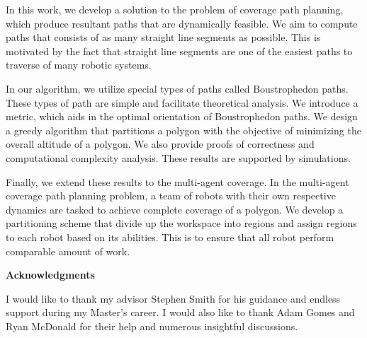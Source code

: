 In this work, we develop a solution to the problem of coverage path planning, which produce resultant paths that are dynamically feasible. We aim to compute paths that consists of as many straight line segments as possible. This is motivated by the fact that straight line segments are one of the easiest paths to traverse of many robotic systems. 

In our algorithm, we utilize special types of paths called Boustrophedon paths. These types of path are simple and facilitate theoretical analysis. We introduce a metric, which aids in the optimal orientation of Boustrophedon paths. We design a greedy algorithm that partitions a polygon with the objective of minimizing the overall altitude of a polygon. We also provide proofs of correctness and computational complexity analysis. These results are supported by simulations. 

Finally, we extend these results to the multi-agent coverage. In the multi-agent coverage path planning problem, a team of robots with their own respective dynamics are tasked to achieve complete coverage of a polygon. We develop a partitioning scheme that divide up the workspace into regions and assign regions to each robot based on its abilities. This is to ensure that all robot perform comparable amount of work.

\cleardoublepage


\begin{center}\textbf{Acknowledgments}\end{center}

I would like to thank my advisor Stephen Smith for his guidance and endless support during my Master's career. I would also like to thank Adam Gomes and Ryan McDonald for their help and numerous insightful discussions.
\cleardoublepage

%
%

\renewcommand\contentsname{Table of Contents}
\tableofcontents
\cleardoublepage
{}

\listoftables
\cleardoublepage
{}		%

